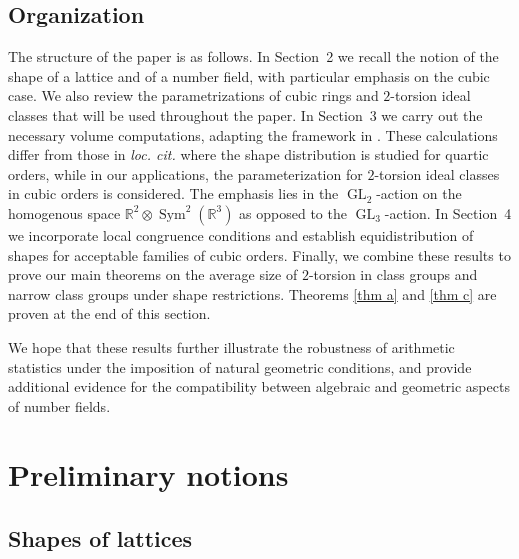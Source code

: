\documentclass[table]{amsart}
\newcommand{\op}[1]{\operatorname{#1}}
\numberwithin{equation}{section}
\begin{document}
\subsection{Organization}
The structure of the paper is as follows. In Section~2 we recall the notion of the shape of a lattice and of a number field, with particular emphasis on the cubic case. We also review the parametrizations of cubic rings and $2$-torsion ideal classes that will be used throughout the paper. In Section~3 we carry out the necessary volume computations, adapting the framework in \cite{bhargavaharron}. These calculations differ from those in \emph{loc. cit.} where the shape distribution is studied for quartic orders, while in our applications, the parameterization for $2$-torsion ideal classes in cubic orders is considered. The emphasis lies in the $\op{GL}_2$-action on the homogenous space $\mathbb{R}^2\otimes\op{Sym}^2(\mathbb{R}^3)$ as opposed to the $\op{GL}_3$-action. In Section~4 we incorporate local congruence conditions and establish equidistribution of shapes for acceptable families of cubic orders. Finally, we combine these results to prove our main theorems on the average size of $2$-torsion in class groups and narrow class groups under shape restrictions. Theorems \ref{thm a} and \ref{thm c} are proven at the end of this section.

\par We hope that these results further illustrate the robustness of arithmetic statistics under the imposition of natural geometric conditions, and provide additional evidence for the compatibility between algebraic and geometric aspects of number fields. 


\section{Preliminary notions}

\subsection{Shapes of lattices}
\end{document}
